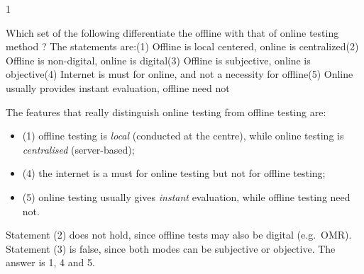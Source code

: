 \begin{question}{1}
{Which set of the following differentiate the offline with that of online testing method ? The statements are:\newline (1) Offline is local centered, online is centralized\newline (2) Offline is non-digital, online is digital\newline (3) Offline is subjective, online is objective\newline (4) Internet is must for online, and not a necessity for offline\newline (5) Online usually provides instant evaluation, offline need not\par}
\begin{explain}
The features that really distinguish online testing from offline testing are:
\begin{itemize}
\item (1) offline testing is \emph{local} (conducted at the centre), while online testing is \emph{centralised} (server-based);
\item (4) the internet is a must for online testing but not for offline testing;
\item (5) online testing usually gives \emph{instant} evaluation, while offline testing need not.
\end{itemize}
Statement (2) does not hold, since offline tests may also be digital (e.g.\ OMR). Statement (3) is false, since both modes can be subjective or objective. The answer is 1, 4 and 5.
\end{explain}
\end{question}

